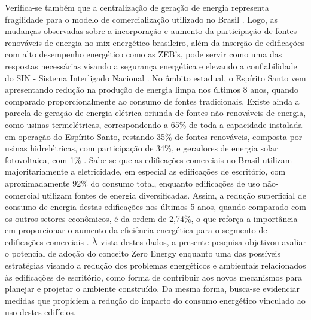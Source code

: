 \begin{onehalfspace}
     Verifica-se  também  que  a  centralização  de  geração  de  energia  representa  fragilidade  
     para  o modelo  de  comercialização  utilizado  no  Brasil \cite{Pinto2017}. 
     Logo,  as mudanças observadas sobre a incorporação e aumento da participação de fontes 
     renováveis de energia  no mix  energético  brasileiro,  além  da  inserção  de  edificações  
     com  alto  desempenho energético como as ZEB’s, pode servir como uma das respostas necessárias 
     visando a segurança energética  e  elevando  a  confiabilidade  do  SIN  -  Sistema  Interligado
     Nacional \cite{EmpresadePesquisaEnergetica-EPE2017a}.\vspace*{0.3cm} \newline No âmbito estadual, o Espírito Santo 
     vem apresentando redução na produção de energia limpa nos últimos 8 anos, quando comparado 
     proporcionalmente ao consumo de fontes tradicionais. Existe ainda a parcela de geração de 
     energia elétrica oriunda de fontes não-renováveis de energia, como usinas termelétricas, 
     correspondendo a 65\% de toda a capacidade instalada em operação do  Espírito  Santo,  
     restando  35\%  de  fontes  renováveis,  composta  por  usinas  hidrelétricas,  com 
     participação  de  34\%,  e  geradores  de  energia  solar  fotovoltaica,  com  1\% 
     \cite{AgenciadeRegulacaodeServicosPublicosdoEspiritoSanto-ARSP2019,EnergiasdePortugal-EDP2017}.\vspace*{0.3cm} \newline
     Sabe-se  que  as  edificações  comerciais no  Brasil  utilizam  majoritariamente  a  eletricidade,  
     em especial  as  edificações  de escritório,  com  aproximadamente  92\%  do  consumo  total,  enquanto edificações  de  
     uso  não-comercial  utilizam  fontes  de  energia  diversificadas.  Assim,  a  redução 
     superficial de consumo de energia destas edificações nos últimos 5 anos, quando comparado 
     com os  outros  setores  econômicos,  é  da  ordem  de  2,74\%,  o  que  reforça  a  
     importância  em proporcionar  o  aumento  da  eficiência  energética  para  o  segmento  
     de  edificações  comerciais \cite{AgenciadeRegulacaodeServicosPublicosdoEspiritoSanto-ARSP2018,
     AgenciadeRegulacaodeServicosPublicosdoEspiritoSanto-ARSP2019,
     EmpresadePesquisaEnergetica-EPE2018}.\vspace*{0.3cm} \newline
     À vista  destes dados,  a presente pesquisa objetivou avaliar  o  potencial de adoção  do  conceito Zero  
     Energy   enquanto   uma  das  possíveis   estratégias  visando   a   redução   dos  
     problemas energéticos e ambientais relacionados às edificações de escritório, como forma 
     de contribuir aos novos mecanismos para planejar e projetar o ambiente construído. Da mesma 
     forma, busca-se evidenciar  medidas que propiciem  a  redução  do impacto  do  consumo  
     energético  vinculado  ao uso destes edifícios.
\end{onehalfspace}